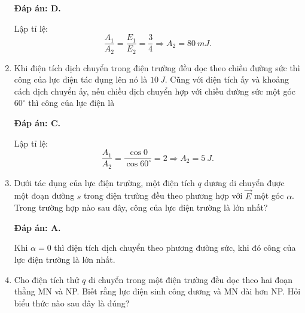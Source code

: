 \begin{enumerate}[label=\bfseries Câu \arabic*:]
{	}
	\loigiai
	{	\textbf{Đáp án: D.}
		
		Lập tỉ lệ:
		$$\dfrac{A_1}{A_2} = \dfrac{E_1}{E_2} = \dfrac{3}{4} \Rightarrow A_2 = \SI{80}{mJ}.$$
	}
	\item {}
	
	\cauhoi
	{Khi điện tích dịch chuyển trong điện trường đều dọc theo chiều đường sức thì công của lực điện tác dụng lên nó là $\SI{10}{J}$. Cũng với điện tích ấy và khoảng cách dịch chuyển ấy, nếu chiều dịch chuyển hợp với chiều đường sức một góc $60^\circ$ thì công của lực điện là
		
	}
	\loigiai
	{	\textbf{Đáp án: C.}
		
		Lập tỉ lệ:
		$$\dfrac{A_1}{A_2} = \dfrac{\cos 0}{\cos 60^\circ} = 2 \Rightarrow A_2 = \SI{5}{J}.$$
	}
	\item {}
	
	\cauhoi
	{Dưới tác dụng của lực điện trường, một điện tích $q$ dương di chuyển được một đoạn đường $s$ trong điện trường đều theo phương hợp với $\vec E$ một góc $\alpha$. Trong trường hợp nào sau đây, công của lực điện trường là lớn nhất?
		
	}
	\loigiai
	{	\textbf{Đáp án: A.}
		
		Khi $\alpha = 0$ thì điện tích dịch chuyển theo phương đường sức, khi đó công của lực điện trường là lớn nhất.
	}
	\item {}
	
	\cauhoi
	{Cho điện tích thử $q$ di chuyển trong một điện trường đều dọc theo hai đoạn thẳng MN và NP. Biết rằng lực điện sinh công dương và MN dài hơn NP. Hỏi biểu thức nào sau đây là đúng?
		
}
\end{enumerate}
